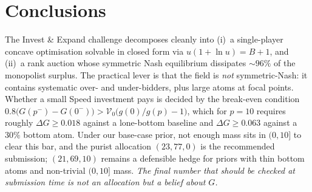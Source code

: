 \documentclass[11pt,a4paper]{article}
\theoremstyle{definition}
\theoremstyle{remark}
\newcommand{\Sp}{\mathcal{V}}
\begin{document}
\section{Conclusions}

The Invest \& Expand challenge decomposes cleanly into (i)~a single-player
concave optimisation solvable in closed form via \(u(1+\ln u)=B+1\), and
(ii)~a rank auction whose symmetric Nash equilibrium dissipates \(\sim 96\%\) of
the monopolist surplus. The practical lever is that the field is \emph{not}
symmetric-Nash: it contains systematic over- and under-bidders, plus large
atoms at focal points. Whether a small Speed investment pays is decided by the
break-even condition
\(0.8\bigl(G(p^{-})-G(0^{-})\bigr)>\Sp_0\bigl(g(0)/g(p)-1\bigr)\), which for
\(p=10\) requires roughly \(\Delta G\ge 0.018\) against a lone-bottom baseline
and \(\Delta G\ge 0.063\) against a \(30\%\) bottom atom. Under our base-case
prior, not enough mass sits in \((0,10]\) to clear this bar, and the purist
allocation \((23,77,0)\) is the recommended submission; \((21,69,10)\) remains
a defensible hedge for priors with thin bottom atoms and non-trivial
\((0,10]\) mass. \emph{The final number that should be checked at submission
time is not an allocation but a belief about \(G\).}
\end{document}

